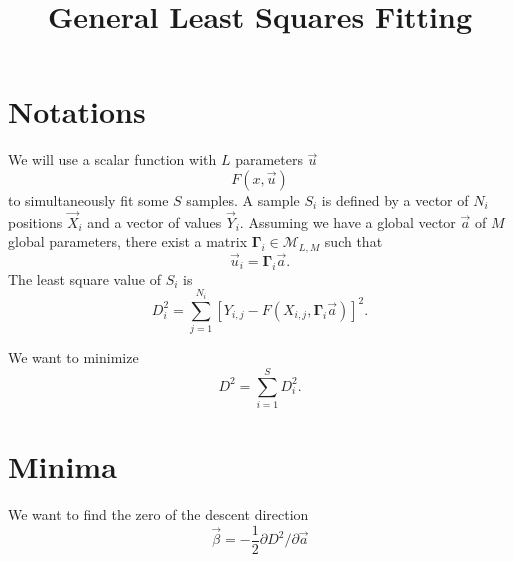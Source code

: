 \documentclass[aps,twocolumn]{revtex4}
\newcommand{\mymat}[1]{\boldsymbol{#1}}
\begin{document}
\title{General Least Squares Fitting}
\maketitle

\section{Notations}
We will use a scalar function with $L$ parameters $\vec{u}$
\begin{equation}
	F(x,\vec{u})
\end{equation}
to simultaneously fit some $S$ samples.
A sample $S_i$ is defined by a vector of $N_i$ positions $\vec{X}_i$ and
a vector of values $\vec{Y}_i$.
Assuming we have a global vector $\vec{a}$ of $M$ global parameters, there exist a
matrix $\mymat{\Gamma}_i\in\mathcal{M}_{L,M}$
such that
\begin{equation}
	\vec{u}_i = \mymat{\Gamma}_i \vec{a}.
\end{equation}
The least square value of $S_i$ is
\begin{equation}
	D^2_i = \sum_{j=1}^{N_i} \left[ Y_{i,j} - F\left(X_{i,j},\mymat{\Gamma}_i \vec{a}\right)\right]^2.
\end{equation}

We want to minimize 
\begin{equation}
	D^2 = \sum_{i=1}^{S} D^2_i.
\end{equation}

\section{Minima}
We want to find the zero of the descent direction
$$\vec{\beta}=-\dfrac{1}{2}\partial D^2 / \partial \vec{a}$$
\end{document}
